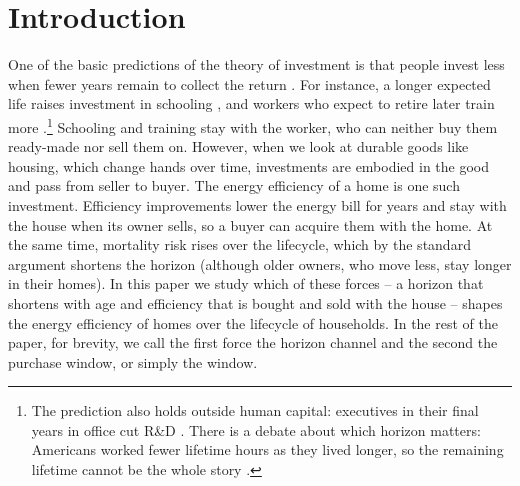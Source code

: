 \section{Introduction}\label{sec:intro}

% 

One of the basic predictions of the theory of investment is that people invest less
when fewer years remain to collect the return
\citep{becker1962investment,ben1967production}. For instance, a longer expected life raises investment in schooling
\citep{jayachandran2009life,oster2013limited,fortson2011mortality}, and
workers who expect to retire later train more
\citep{montizaan2010effects}.\footnote{The prediction also holds outside
human capital: executives in their final years in office cut R\&D
\citep{dechow1991executive}. There is a debate about which horizon matters:
Americans worked fewer lifetime hours as they lived longer, so the
remaining lifetime cannot be the whole story
\citep{hazan2009longevity,cervellati2013life}.} Schooling and training stay
with the worker, who can neither buy them ready-made nor sell them on. However, when we look at durable goods like housing, which change hands over
time, investments are embodied in the good and pass from seller to buyer.
The energy efficiency of a home is one such investment. Efficiency
improvements lower the energy bill for years and stay with the house when
its owner sells, so a buyer can acquire them with the home. At the
same time,  mortality risk rises over the lifecycle,  which by the
standard argument shortens the horizon (although older owners, who move
less, stay longer in their homes). In this paper we study  which of these forces -- a horizon that shortens with age
and efficiency that is bought and sold with the house -- shapes
the energy efficiency of  homes over the lifecycle of households. In the rest of the paper, for brevity, we call the first force the horizon channel and the second the purchase window, or simply the window.


